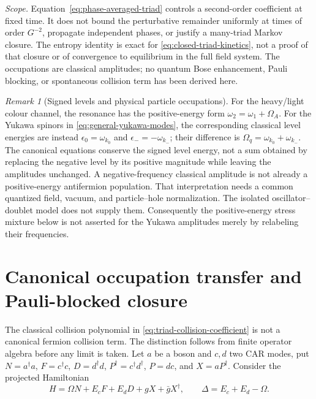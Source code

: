 \documentclass[11pt,a4paper,oneside]{book}
\theoremstyle{plain}
\theoremstyle{definition}
\theoremstyle{remark}
\newtheorem{remark}[theorem]{Remark}
\newcommand{\src}[2]{\cite{#1}}
\newcommand{\scope}[1]{\par\smallskip\noindent\textit{Scope.} #1\par\smallskip}
\begin{document}
\scope{Equation~\eqref{eq:phase-averaged-triad} controls a second-order
coefficient at fixed time.  It does not bound the perturbative remainder
uniformly at times of order $G^{-2}$, propagate independent phases, or
justify a many-triad Markov closure.  The entropy identity is exact for
\eqref{eq:closed-triad-kinetics}, not a proof of that closure or of
convergence to equilibrium in the full field system.  The occupations
are classical amplitudes; no quantum Bose enhancement, Pauli blocking,
or spontaneous collision term has been derived here.}

\begin{remark}[Signed levels and physical particle occupations]
\label{rem:signed-kinetic-levels}
For the heavy/light colour channel, the resonance has the positive-energy
form $\omega_2=\omega_1+\Omega_A$.  For the Yukawa spinors in
\eqref{eq:general-yukawa-modes}, the corresponding classical level
energies are instead $\epsilon_0=\omega_{k_0}$ and
$\epsilon_-=-\omega_{k_-}$; their difference is
$\Omega_q=\omega_{k_0}+\omega_{k_-}$.  The canonical equations conserve
the signed level energy, not a sum obtained by replacing the negative
level by its positive magnitude while leaving the amplitudes unchanged.
A negative-frequency classical amplitude is not already a positive-energy
antifermion population.  That interpretation needs a common quantized
field, vacuum, and particle--hole normalization.  The isolated
oscillator--doublet model does not supply them.  Consequently the
positive-energy stress mixture below is not asserted for the Yukawa
amplitudes merely by relabeling their frequencies.
\end{remark}
\src{R20}{thm:v20v31-modes,thm:v20v34-H,thm:v20v36-mixture}

\section{Canonical occupation transfer and Pauli-blocked closure}
\label{sec:canonical-pauli}
The classical collision polynomial in
\eqref{eq:triad-collision-coefficient} is not a canonical fermion
collision term.  The distinction follows from finite operator algebra
before any limit is taken.  Let $a$ be a boson and $c,d$ two CAR modes,
put $N=a^\dagger a$, $F=c^\dagger c$, $D=d^\dagger d$,
$P^\dagger=c^\dagger d^\dagger$, $P=dc$, and $X=aP^\dagger$.
Consider the projected Hamiltonian
\begin{equation}
 H=\Omega N+E_cF+E_dD+gX+\bar gX^\dagger,\qquad
 \Delta=E_c+E_d-\Omega.
 \label{eq:canonical-single-pair}
\end{equation}
\end{document}
